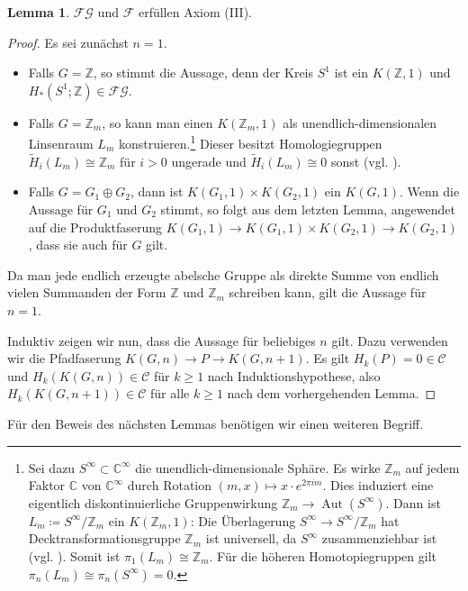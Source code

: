 \documentclass[11pt, a4paper, german]{article}
\theoremstyle{definition}
\newtheorem{lem}{Lemma}
\theoremstyle{remark}
\newcommand{\Z}{\mathbb{Z}} %
\newcommand{\C}{\mathbb{C}} %
\newcommand{\SC}{\mathcal{C}} %
\newcommand{\FG}{\mathcal{FG}} %
\newcommand{\F}{\mathcal{F}} %
\DeclareMathOperator{\Aut}{Aut} %
\begin{document}
\begin{lem}\label{homology-kgn-in-c}
  $\FG$ und $\F$ erfüllen Axiom (III).
\end{lem}

\begin{proof}
  Es sei zunächst $n=1$.
  \begin{itemize}
    \item Falls $G = \Z$, so stimmt die Aussage, denn der Kreis $S^1$ ist ein $K(\Z, 1)$ und $H_*(S^1; \Z) \in \FG$.
    \item Falls $G = \Z_m$, so kann man einen $K(\Z_m, 1)$ als unendlich-dimensionalen Linsenraum $L_m$ konstruieren.\footnote{Sei dazu $S^\infty \subset \C^\infty$ die unendlich-dimensionale Sphäre. Es wirke $\Z_m$ auf jedem Faktor $\C$ von $\C^\infty$ durch Rotation $(m, x) \mapsto x \cdot e^{2 \pi i m}$. Dies induziert eine eigentlich diskontinuierliche Gruppenwirkung $\Z_m \to \Aut(S^\infty)$. Dann ist $L_m \coloneqq S^\infty / \Z_m$ ein $K(\Z_m, 1)$: Die Überlagerung $S^\infty \to S^\infty / \Z_m$ hat Decktransformationsgruppe $\Z_m$ ist universell, da $S^\infty$ zusammenziehbar ist (vgl. \cite[\mbox{}1B.3-1B.4]{hatcher:at}). Somit ist $\pi_1(L_m) \cong \Z_m$. Für die höheren Homotopiegruppen gilt $\pi_n(L_m) \cong \pi_n(S^\infty) = 0$.}
    Dieser besitzt Homologiegruppen $\tilde{H}_i(L_m) \cong \Z_m$ für $i > 0$ ungerade und $\tilde{H}_i(L_m) \cong 0$ sonst (vgl. \cite[\mbox{}2.43]{hatcher:at}).
    \item Falls $G = G_1 \oplus G_2$, dann ist $K(G_1, 1) \times K(G_2, 1)$ ein $K(G, 1)$.
    Wenn die Aussage für $G_1$ und $G_2$ stimmt, so folgt aus dem letzten Lemma, angewendet auf die Produktfaserung $K(G_1, 1) \to K(G_1, 1) \times K(G_2, 1) \to K(G_2, 1)$, dass sie auch für $G$ gilt.
  \end{itemize}
  Da man jede endlich erzeugte abelsche Gruppe als direkte Summe von endlich vielen Summanden der Form $\Z$ und $\Z_m$ schreiben kann, gilt die Aussage für $n=1$.

  Induktiv zeigen wir nun, dass die Aussage für beliebiges $n$ gilt.
  Dazu verwenden wir die Pfadfaserung $K(G, n) \to P \to K(G, n{+}1)$.
  Es gilt $H_k(P) = 0 \in \SC$ und $H_k(K(G, n)) \in \SC$ für $k \geq 1$ nach Induktionshypothese, also $H_k(K(G, n{+}1)) \in \SC$ für alle $k \geq 1$ nach dem vorhergehenden Lemma.
\end{proof}

Für den Beweis des nächsten Lemmas benötigen wir einen weiteren Begriff.
\end{document}
